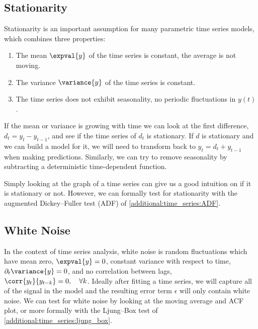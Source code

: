 \subsection{Stationarity}
\label{additional:time_series:stationarity}

Stationarity is an important assumption for many parametric time series models,
which combines three properties:

\begin{enumerate}[noitemsep]
\item The mean $\expval{y}$ of the time series is constant, \ie the average is not moving.\label{item:time_series:stationarity:constant_mean}
\item The variance $\variance{y}$ of the time series is constant.\label{item:time_series:stationarity:constant_var}
\item The time series does not exhibit seasonality, \ie no periodic fluctuations in $y\left(t\right)$.
\label{item:time_series:stationarity:seasonality}
\end{enumerate}

If the mean or variance is growing with time
we can look at the first difference, $d_{t} = y_{t} -y_{t-1}$,
and see if the time series of $d_{t}$ is stationary.
If $d$ is stationary and we can build a model for it, we will
need to transform back to $y_{t} = d_{t} + y_{t-1}$ when making predictions.
Similarly, we can try to remove seasonality
by subtracting a deterministic time-dependent function.

Simply looking at the graph of a time series can give us
a good intuition on if it is stationary or not.
However, we can formally test for stationarity
with the augmented Dickey--Fuller test (ADF) of \cref{additional:time_series:ADF}.

\subsection{White Noise}
\label{additional:time_series:white_noise}

In the context of time series analysis, white noise is random fluctuations which
have mean zero, $\expval{y} = 0$,
constant variance with respect to time, $\partial_{t} \variance{y} = 0$,
and no correlation between lags, $\corr{y_{t}}{y_{t-k}} = 0,\quad \forall k$.
Ideally after fitting a time series, we will capture all of the signal
in the model and the resulting error term $\epsilon$ will only contain white noise.
We can test for white noise by looking at the moving average and ACF plot,
or more formally with the Ljung--Box test of \cref{additional:time_series:ljung_box}.

